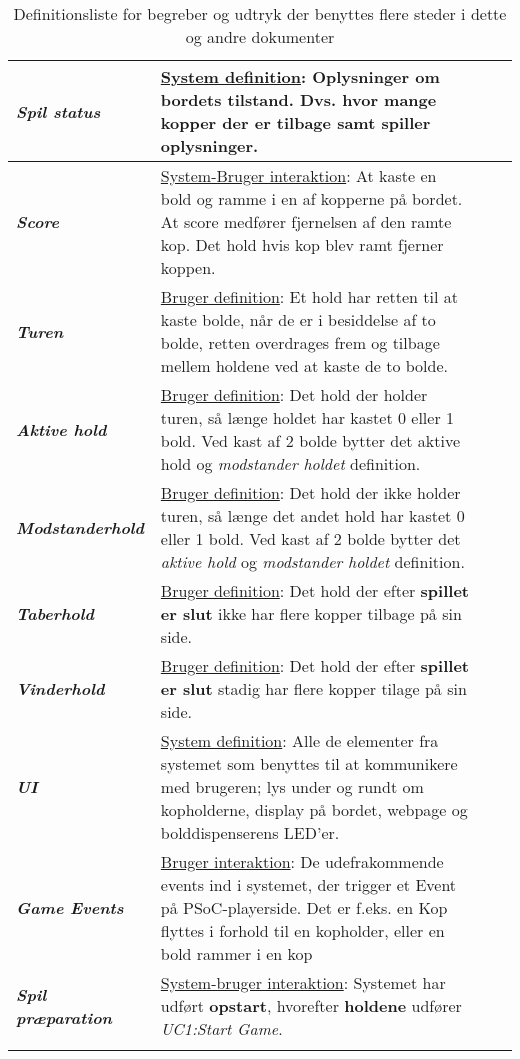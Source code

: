 \documentclass[Kravspecifikation/Kravspec_Main.tex]{subfiles}
\begin{document}
\begin{longtable}{|>{\centering\arraybackslash}m{4cm}|>{\RaggedRight\arraybackslash}m{10cm}| p{} | p{}|}
        \hline
        \textit{\textbf{Spil status}} & \underline{System definition}:
        Oplysninger om bordets tilstand. Dvs. hvor mange kopper der er tilbage samt spiller oplysninger.\\
        \hline
        \textit{\textbf{Score}} & \underline{System-Bruger interaktion}:
        At kaste en bold og ramme i en af kopperne på bordet. At score medfører fjernelsen af den ramte kop. Det hold hvis kop blev ramt fjerner koppen. \\
        \hline
        \textit{\textbf{Turen}} & \underline{Bruger definition}:
        Et hold har retten til at kaste bolde, når de er i besiddelse af to bolde, retten overdrages frem og tilbage mellem holdene ved at kaste de to bolde. \\
        \hline
        \textit{\textbf{Aktive hold}} & \underline{Bruger definition}:
        Det hold der holder turen, så længe holdet har kastet 0 eller 1 bold. Ved kast af 2 bolde bytter det aktive hold og \textit{modstander holdet} definition.\\
        \hline
        \textit{\textbf{Modstanderhold}} & \underline{Bruger definition}:
        Det hold der ikke holder turen, så længe det andet hold har kastet 0 eller 1 bold. Ved kast af 2 bolde bytter det \textit{aktive hold} og \textit{modstander holdet} definition.\\
        \hline
        \textit{\textbf{Taberhold}} & \underline{Bruger definition}:
        Det hold der efter \textbf{spillet er slut} ikke har flere kopper tilbage på sin side.\\
        \hline
        \textit{\textbf{Vinderhold}} & \underline{Bruger definition}:
        Det hold der efter \textbf{spillet er slut} stadig har flere kopper tilage på sin side.\\
        \hline
        \textit{\textbf{UI}} & \underline{System definition}:
        Alle de elementer fra systemet som benyttes til at kommunikere med brugeren; lys under og rundt om kopholderne, display på bordet, webpage og bolddispenserens LED'er.\\
        \hline
        \textit{\textbf{Game Events}} & \underline{Bruger interaktion}:
        De udefrakommende events ind i systemet, der trigger et Event på PSoC-playerside. Det er f.eks. en Kop flyttes i forhold til en kopholder, eller en bold rammer i en kop\\
        \hline
        \textit{\textbf{Spil præparation}} & \underline{System-bruger interaktion}:
        Systemet har udført \textbf{opstart}, hvorefter \textbf{holdene} udfører \textit{UC1:Start Game}. \\
        \hline
        
    \caption{Definitionsliste for begreber og udtryk der benyttes flere steder i dette og andre dokumenter}
    \label{tab:def_liste}
    \end{longtable}
\end{document}
